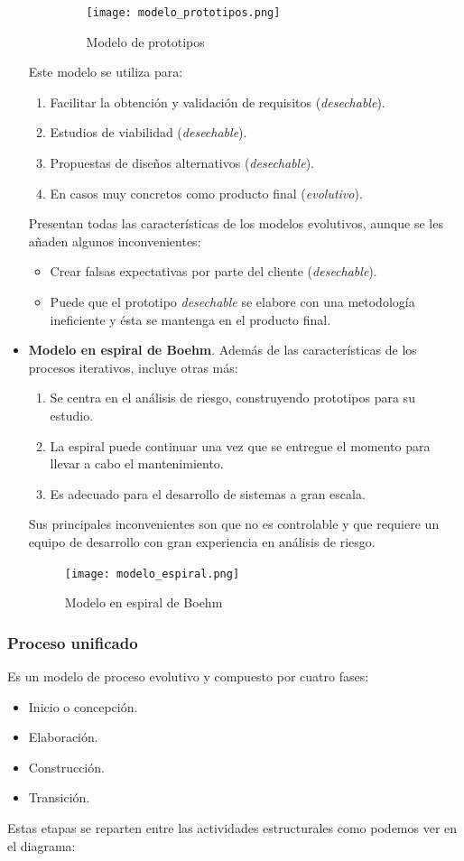\documentclass[12pt,spanish]{article}
\begin{document}
\begin{itemize}
\begin{enumerate}
		\begin{figure}[H]
		\centering
		\texttt{[image: modelo\_prototipos.png]}
		\caption{Modelo de prototipos}
		\end{figure}
	\end{enumerate}
	Este modelo se utiliza para:
	\begin{enumerate}
		\item Facilitar la obtención y validación de requisitos (\emph{desechable}).
		\item Estudios de viabilidad (\emph{desechable}).
		\item Propuestas de diseños alternativos (\emph{desechable}).
		\item En casos muy concretos como producto final (\emph{evolutivo}). 
	\end{enumerate}
	Presentan todas las características de los modelos evolutivos, aunque se les añaden algunos inconvenientes:
	\begin{itemize}
		\item Crear falsas expectativas por parte del cliente (\emph{desechable}).
		\item Puede que el prototipo \emph{desechable} se elabore con una metodología ineficiente y ésta se mantenga en el producto final.
	\end{itemize}
	\item \textbf{Modelo en espiral de Boehm}. Además de las características de los procesos iterativos, incluye otras más:
	\begin{enumerate}
		\item Se centra en el análisis de riesgo, construyendo prototipos para su estudio.
		\item La espiral puede continuar una vez que se entregue el momento para llevar a cabo el mantenimiento.
		\item Es adecuado para el desarrollo de sistemas a gran escala.
	\end{enumerate}
	Sus principales inconvenientes son que no es controlable y que requiere un equipo de desarrollo con gran experiencia en análisis de riesgo.
	\begin{figure}[H]
		\centering
		\texttt{[image: modelo\_espiral.png]}
		\caption{Modelo en espiral de Boehm}
	\end{figure}
\end{itemize}

\subsubsection{Proceso unificado}
Es un modelo de proceso evolutivo y compuesto por cuatro fases:
\begin{itemize}
	\item Inicio o concepción.
	\item Elaboración.
	\item Construcción.
	\item Transición.
\end{itemize}
Estas etapas se reparten entre las actividades estructurales como podemos ver en el diagrama:
\end{document}
